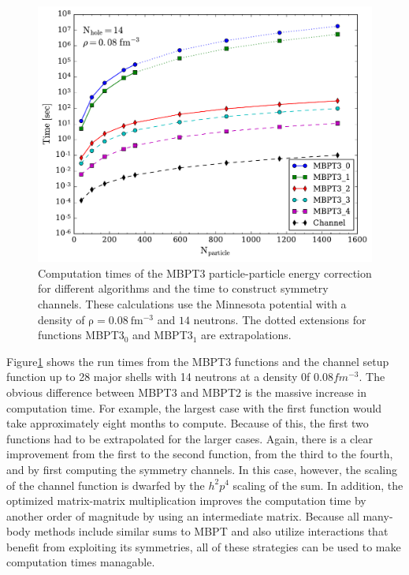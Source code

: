 \begin{figure}
  \includegraphics[width=\linewidth]{Chapter8-figures/MBPT3fig.pdf}
  \caption{Computation times of the MBPT3 particle-particle energy correction for different algorithms and the time to construct symmetry channels. These calculations use the Minnesota potential with a density of $\mathrm{\rho=0.08\ fm^{-3}}$ and $\mathrm{14}$ neutrons. The dotted extensions for functions MBPT3$_0$ and MBPT3$_1$ are extrapolations.}
  \label{fig:fig6}
\end{figure}

Figure\ref{fig:fig6} shows the run times from the MBPT3 functions and the channel setup function up to 28 major shells with 14 neutrons at a density 0f $0.08 fm^{-3}$. The obvious difference between MBPT3 and MBPT2 is the massive increase in computation time. For example, the largest case with the first function would take approximately eight months to compute. Because of this, the first two functions had to be extrapolated for the larger cases. Again, there is a clear improvement from the first to the second function, from the third to the fourth, and by first computing the symmetry channels. In this case, however, the scaling of the channel function is dwarfed by the $h^2p^4$ scaling of the sum. In addition, the optimized matrix-matrix multiplication improves the computation time by another order of magnitude by using an intermediate matrix. Because all many-body methods include similar sums to MBPT and also utilize interactions that benefit from exploiting its symmetries, all of these strategies can be used to make computation times managable.

